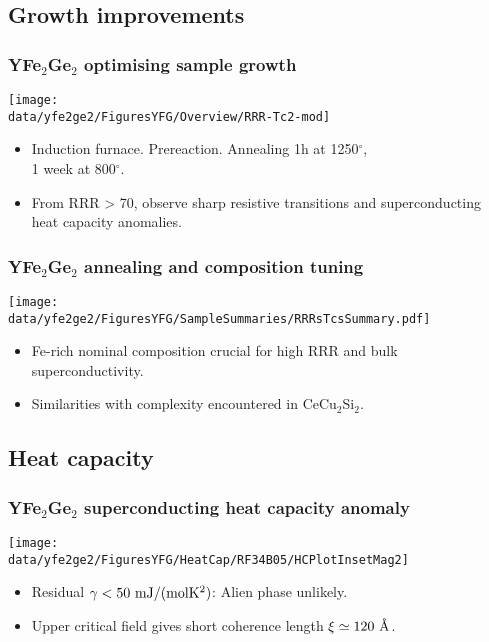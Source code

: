 \subsection{Growth improvements}
\begin{frame}[label=YFGSampleGrowth]
\frametitle{YFe$_2$Ge$_2$ optimising sample growth}
\centerline{\texttt{[image: \\data/yfe2ge2/FiguresYFG/Overview/RRR-Tc2-mod]}}

\begin{itemize}
\item 
Induction furnace. Prereaction. Annealing
1h at 1250$^\circ$, \\ 1 week at 800$^\circ$. 

\item
From RRR > 70, observe sharp resistive transitions and superconducting
heat capacity anomalies.

\end{itemize}

\end{frame}

\begin{frame}[label=CompositionOverview]
\frametitle{YFe$_2$Ge$_2$ annealing and composition tuning}
\texttt{[image: \\data/yfe2ge2/FiguresYFG/SampleSummaries/RRRsTcsSummary.pdf]}
\vspace{1em}
\begin{itemize}
\item
Fe-rich nominal composition crucial for high
RRR and bulk superconductivity.
\item
Similarities with complexity encountered in CeCu$_2$Si$_2$.
\end{itemize}

\end{frame}


\subsection{Heat capacity}
\begin{frame}[label=YFGHeatCap2]
\frametitle{YFe$_2$Ge$_2$ superconducting heat capacity anomaly}
\centerline{\texttt{[image: \\data/yfe2ge2/FiguresYFG/HeatCap/RF34B05/HCPlotInsetMag2]}}




\begin{itemize}
\item
Residual $\gamma < 50~{\rm mJ/(mol K^2)}$:
Alien phase unlikely.

\item 
Upper critical field gives short coherence length $\xi \simeq 120
~\mbox{\AA}$.
\end{itemize}
\end{frame}

